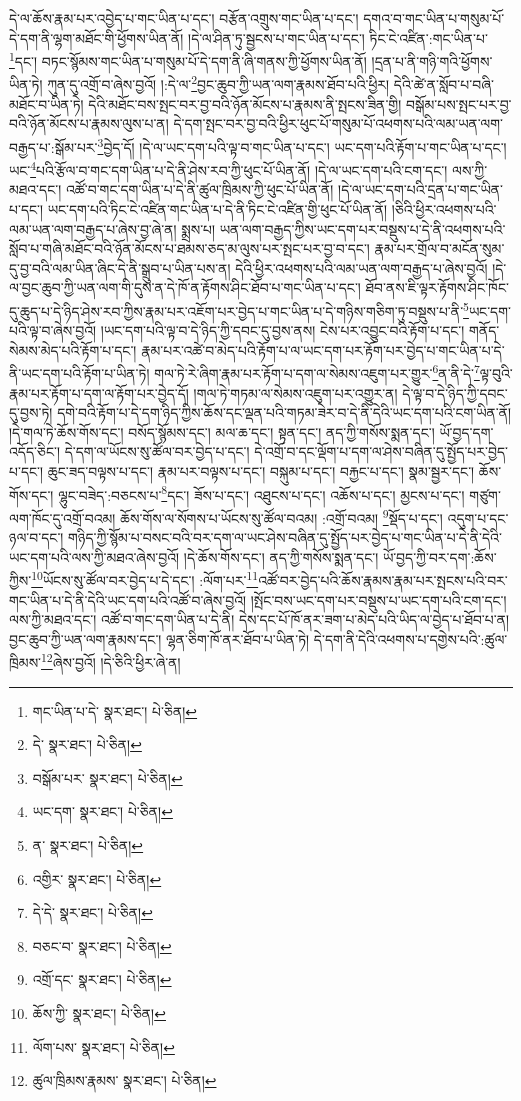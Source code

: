 དེ་ལ་ཆོས་རྣམ་པར་འབྱེད་པ་གང་ཡིན་པ་དང་། བརྩོན་འགྲུས་གང་ཡིན་པ་དང་། དགའ་བ་གང་ཡིན་པ་གསུམ་པོ་དེ་དག་ནི་ལྷག་མཐོང་གི་ཕྱོགས་ཡིན་ནོ། །དེ་ལ་ཤིན་ཏུ་སྦྱངས་པ་གང་ཡིན་པ་དང་། ཏིང་ངེ་འཛིན་:གང་ཡིན་པ་\footnote{གང་ཡིན་པ་དེ་  སྣར་ཐང་།  པེ་ཅིན། }དང་། བཏང་སྙོམས་གང་ཡིན་པ་གསུམ་པོ་དེ་དག་ནི་ཞི་གནས་ཀྱི་ཕྱོགས་ཡིན་ནོ། །དྲན་པ་ནི་གཉི་གའི་ཕྱོགས་ཡིན་ཏེ། ཀུན་དུ་འགྲོ་བ་ཞེས་བྱའོ། །:དེ་ལ་\footnote{དེ་  སྣར་ཐང་།  པེ་ཅིན། }བྱང་ཆུབ་ཀྱི་ཡན་ལག་རྣམས་ཐོབ་པའི་ཕྱིར། དེའི་ཚེ་ན་སློབ་པ་བཞི་མཐོང་བ་ཡིན་ཏེ། དེའི་མཐོང་བས་སྤང་བར་བྱ་བའི་ཉོན་མོངས་པ་རྣམས་ནི་སྤངས་ཟིན་གྱི། བསྒོམ་པས་སྤང་པར་བྱ་བའི་ཉོན་མོངས་པ་རྣམས་ལུས་པ་ན། དེ་དག་སྤང་བར་བྱ་བའི་ཕྱིར་ཕུང་པོ་གསུམ་པོ་འཕགས་པའི་ལམ་ཡན་ལག་བརྒྱད་པ་:སྒོམ་པར་\footnote{བསྒོམ་པར་  སྣར་ཐང་།  པེ་ཅིན། }བྱེད་དོ། །དེ་ལ་ཡང་དག་པའི་ལྟ་བ་གང་ཡིན་པ་དང་། ཡང་དག་པའི་རྟོག་པ་གང་ཡིན་པ་དང་། ཡང་\footnote{ཡང་དག་  སྣར་ཐང་།  པེ་ཅིན། }པའི་རྩོལ་བ་གང་དག་ཡིན་པ་དེ་ནི་ཤེས་རབ་ཀྱི་ཕུང་པོ་ཡིན་ནོ། །དེ་ལ་ཡང་དག་པའི་ངག་དང་། ལས་ཀྱི་མཐའ་དང་། འཚོ་བ་གང་དག་ཡིན་པ་དེ་ནི་ཚུལ་ཁྲིམས་ཀྱི་ཕུང་པོ་ཡིན་ནོ། །དེ་ལ་ཡང་དག་པའི་དྲན་པ་གང་ཡིན་པ་དང་། ཡང་དག་པའི་ཏིང་ངེ་འཛིན་གང་ཡིན་པ་དེ་ནི་ཏིང་ངེ་འཛིན་གྱི་ཕུང་པོ་ཡིན་ནོ། །ཅིའི་ཕྱིར་འཕགས་པའི་ལམ་ཡན་ལག་བརྒྱད་པ་ཞེས་བྱ་ཞེ་ན། སྨྲས་པ། ཡན་ལག་བརྒྱད་ཀྱིས་ཡང་དག་པར་བསྡུས་པ་དེ་ནི་འཕགས་པའི་སློབ་པ་གཞི་མཐོང་བའི་ཉོན་མོངས་པ་ཐམས་ཅད་མ་ལུས་པར་སྤང་པར་བྱ་བ་དང་། རྣམ་པར་གྲོལ་བ་མངོན་སུམ་དུ་བྱ་བའི་ལམ་ཡིན་ཞིང་དེ་ནི་སྒྲུབ་པ་ཡིན་པས་ན། དེའི་ཕྱིར་འཕགས་པའི་ལམ་ཡན་ལག་བརྒྱད་པ་ཞེས་བྱའོ། །དེ་ལ་བྱང་ཆུབ་ཀྱི་ཡན་ལག་གི་དུས་ན་དེ་ཁོ་ན་རྟོགས་ཤིང་ཐོབ་པ་གང་ཡིན་པ་དང་། ཐོབ་ནས་ཇི་ལྟར་རྟོགས་ཤིང་ཁོང་དུ་ཆུད་པ་དེ་ཉིད་ཤེས་རབ་ཀྱིས་རྣམ་པར་འཇོག་པར་བྱེད་པ་གང་ཡིན་པ་དེ་གཉིས་གཅིག་ཏུ་བསྡུས་པ་ནི་\footnote{ན་  སྣར་ཐང་།  པེ་ཅིན། }ཡང་དག་པའི་ལྟ་བ་ཞེས་བྱའོ། །ཡང་དག་པའི་ལྟ་བ་དེ་ཉིད་ཀྱི་དབང་དུ་བྱས་ནས། ངེས་པར་འབྱུང་བའི་རྟོག་པ་དང་། གནོད་སེམས་མེད་པའི་རྟོག་པ་དང་། རྣམ་པར་འཚེ་བ་མེད་པའི་རྟོག་པ་ལ་ཡང་དག་པར་རྟོག་པར་བྱེད་པ་གང་ཡིན་པ་དེ་ནི་ཡང་དག་པའི་རྟོག་པ་ཡིན་ཏེ། གལ་ཏེ་རེ་ཞིག་རྣམ་པར་རྟོག་པ་དག་ལ་སེམས་འཇུག་པར་གྱུར་\footnote{འགྱིར་  སྣར་ཐང་།  པེ་ཅིན། }ན་ནི་དེ་\footnote{དེ་དེ་  སྣར་ཐང་།  པེ་ཅིན། }ལྟ་བུའི་རྣམ་པར་རྟོག་པ་དག་ལ་རྟོག་པར་བྱེད་དོ། །གལ་ཏེ་གཏམ་ལ་སེམས་འཇུག་པར་འགྱུར་ན། དེ་ལྟ་བ་དེ་ཉིད་ཀྱི་དབང་དུ་བྱས་ཏེ། དགེ་བའི་རྟོག་པ་དེ་དག་ཉིད་ཀྱིས་ཆོས་དང་ལྡན་པའི་གཏམ་ཟེར་བ་དེ་ནི་དེའི་ཡང་དག་པའི་ངག་ཡིན་ནོ། །དེ་གལ་ཏེ་ཆོས་གོས་དང་། བསོད་སྙོམས་དང་། མལ་ཆ་དང་། སྟན་དང་། ནད་ཀྱི་གསོས་སྨན་དང་། ཡོ་བྱད་དག་འདོད་ཅིང་། དེ་དག་ལ་ཡོངས་སུ་ཚོལ་བར་བྱེད་པ་དང་། དེ་འགྲོ་བ་དང་ལྡོག་པ་དག་ལ་ཤེས་བཞིན་དུ་སྤྱོད་པར་བྱེད་པ་དང་། ཆུང་ཟད་བལྟས་པ་དང་། རྣམ་པར་བལྟས་པ་དང་། བསྐུམ་པ་དང་། བརྐྱང་པ་དང་། སྣམ་སྦྱར་དང་། ཆོས་གོས་དང་། ལྷུང་བཟེད་:བཅངས་པ་\footnote{བཅང་བ་  སྣར་ཐང་།  པེ་ཅིན། }དང་། ཟོས་པ་དང་། འཐུངས་པ་དང་། འཆོས་པ་དང་། མྱངས་པ་དང་། གཙུག་ལག་ཁོང་དུ་འགྲོ་བའམ། ཆོས་གོས་ལ་སོགས་པ་ཡོངས་སུ་ཚོལ་བའམ། :འགྲོ་བའམ། \footnote{འགྲོ་དང་  སྣར་ཐང་།  པེ་ཅིན། }སྡོད་པ་དང་། འདུག་པ་དང་ཉལ་བ་དང་། གཉིད་ཀྱི་སྙོམ་པ་བསང་བའི་བར་དག་ལ་ཡང་ཤེས་བཞིན་དུ་སྤྱོད་པར་བྱེད་པ་གང་ཡིན་པ་དེ་ནི་དེའི་ཡང་དག་པའི་ལས་ཀྱི་མཐའ་ཞེས་བྱའོ། །དེ་ཆོས་གོས་དང་། ནད་ཀྱི་གསོས་སྨན་དང་། ཡོ་བྱད་ཀྱི་བར་དག་:ཆོས་ཀྱིས་\footnote{ཆོས་ཀྱི་  སྣར་ཐང་།  པེ་ཅིན། }ཡོངས་སུ་ཚོལ་བར་བྱེད་པ་དེ་དང་། :ལོག་པར་\footnote{ལོག་པས་  སྣར་ཐང་།  པེ་ཅིན། }འཚོ་བར་བྱེད་པའི་ཆོས་རྣམས་རྣམ་པར་སྤངས་པའི་བར་གང་ཡིན་པ་དེ་ནི་དེའི་ཡང་དག་པའི་འཚོ་བ་ཞེས་བྱའོ། །སྤོང་བས་ཡང་དག་པར་བསྡུས་པ་ཡང་དག་པའི་ངག་དང་། ལས་ཀྱི་མཐའ་དང་། འཚོ་བ་གང་དག་ཡིན་པ་དེ་ནི། དེས་དང་པོ་ཁོ་ནར་ཟག་པ་མེད་པའི་ཡིད་ལ་བྱེད་པ་ཐོབ་པ་ན། བྱང་ཆུབ་ཀྱི་ཡན་ལག་རྣམས་དང་། ལྷན་ཅིག་ཁོ་ནར་ཐོབ་པ་ཡིན་ཏེ། དེ་དག་ནི་དེའི་འཕགས་པ་དགྱེས་པའི་:ཚུལ་ཁྲིམས་\footnote{ཚུལ་ཁྲིམས་རྣམས་  སྣར་ཐང་།  པེ་ཅིན། }ཞེས་བྱའོ། །དེ་ཅིའི་ཕྱིར་ཞེ་ན། 